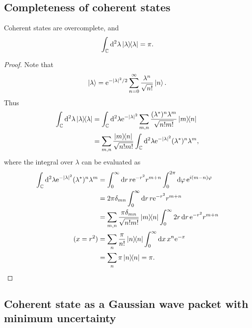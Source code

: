\documentclass[10pt]{article}
\begin{document}
	\subsection{Completeness of coherent states}
	Coherent states are overcomplete, and
	\begin{equation}
		\int_{\mathbb{C}} \dd^2{\lambda} \dyad{\lambda}{\lambda} = \pi.
	\end{equation}
	\begin{proof}
		Note that
		\begin{equation}
			\ket{\lambda} = {\mathrm{e}}^{-\abs{\lambda}^2/2} \sum_{n=0}^{\infty} \frac{\lambda^n}{\sqrt{n!}} \ket{n}.
		\end{equation}
		Thus
		\begin{align*}
			\int_{\mathbb{C}} \dd^2{\lambda} \dyad{\lambda}{\lambda} &= \int_{\mathbb{C}} \dd^2{\lambda} \e^{-\abs{\lambda}^2} \sum_{m,n} \frac{(\lambda^*)^n \lambda^m}{\sqrt{n!m!}} \dyad{m}{n} \\
			&= \sum_{m,n} \frac{\dyad{m}{n}}{\sqrt{n!m!}} \int_{\mathbb{C}} \dd^2{\lambda} \e^{-\abs{\lambda}^2} (\lambda^*)^n \lambda^m,
		\end{align*}
		where the integral over $\lambda$ can be evaluated as
		\begin{align*}
			\int_{\mathbb{C}} \dd^2{\lambda} \e^{-\abs{\lambda}^2} (\lambda^*)^n \lambda^m &= \int_0^{\infty} \dd{r} r \e^{-r^2} r^{m+n} \int_0^{2\pi} \dd{\varphi} \e^{i(m-n) \varphi} \\
			&= 2\pi \delta_{mn} \int_0^{\infty} \dd{r} r \e^{-r^2} r^{m+n} \\
			&= \sum_{m,n} \frac{\pi \delta_{mn}}{\sqrt{n!m!}} \dyad{m}{n} \int_0^{\infty} 2r \dd{r} \e^{-r^2} r^{m+n} \\
			(x = r^2) &= \sum_n \frac{\pi}{n!} \dyad{n} \int_0^{\infty} \dd{x} x^n \e^{-x} \\
			&= \sum_n \pi \dyad{n} = \pi.
		\end{align*}
	\end{proof}

	\subsection{Coherent state as a Gaussian wave packet with minimum uncertainty}
\end{document}
